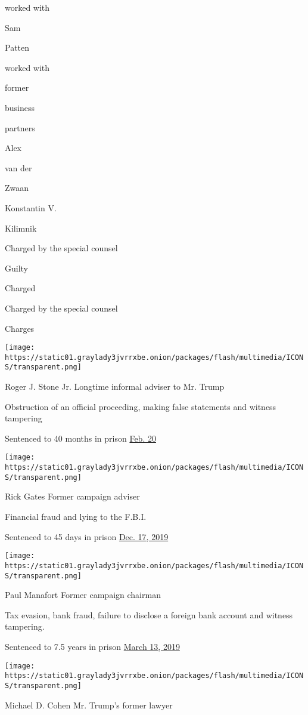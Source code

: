 worked with

Sam

Patten

worked with

former

business

partners

Alex

van der

Zwaan

Konstantin V.

Kilimnik

Charged by the special counsel

Guilty

Charged

Charged by the special counsel

Charges

\texttt{[image: https://static01.graylady3jvrrxbe.onion/packages/flash/multimedia/ICONS/transparent.png]}

Roger J. Stone Jr. Longtime informal adviser to Mr. Trump

Obstruction of an official proceeding, making false statements and
witness tampering

Sentenced to 40 months in prison
\href{https://www.nytimes3xbfgragh.onion/2020/02/20/us/roger-stone-sentencing.html}{Feb.
20}

\texttt{[image: https://static01.graylady3jvrrxbe.onion/packages/flash/multimedia/ICONS/transparent.png]}

Rick Gates Former campaign adviser

Financial fraud and lying to the F.B.I.

Sentenced to 45 days in prison
\href{https://www.nytimes3xbfgragh.onion/2019/12/17/us/politics/rick-gates-sentencing.html}{Dec.
17, 2019}

\texttt{[image: https://static01.graylady3jvrrxbe.onion/packages/flash/multimedia/ICONS/transparent.png]}

Paul Manafort Former campaign chairman

Tax evasion, bank fraud, failure to disclose a foreign bank account and
witness tampering.

Sentenced to 7.5 years in prison
\href{https://www.nytimes3xbfgragh.onion/2019/03/13/us/politics/paul-manafort-sentencing.html}{March
13, 2019}

\texttt{[image: https://static01.graylady3jvrrxbe.onion/packages/flash/multimedia/ICONS/transparent.png]}

Michael D. Cohen Mr. Trump's former lawyer

